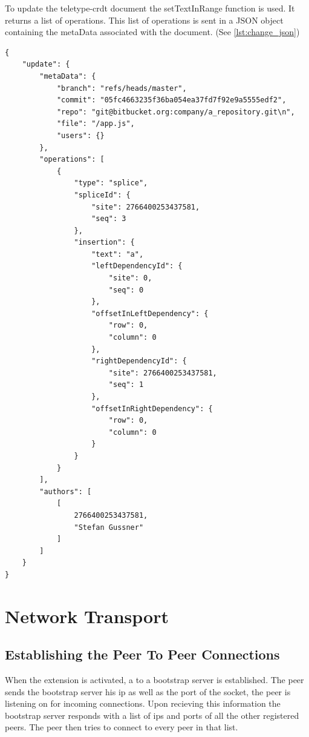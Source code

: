 To update the teletype-crdt document the setTextInRange function is used. It returns a list of operations. This list of operations is sent in a JSON object containing the metaData associated with the document. (See \ref{lst:change_json})

\begin{lstlisting}[label={lst:change_json}, caption=Network Data Packet]
{
    "update": {
        "metaData": {
            "branch": "refs/heads/master",
            "commit": "05fc4663235f36ba054ea37fd7f92e9a5555edf2",
            "repo": "git@bitbucket.org:company/a_repository.git\n",
            "file": "/app.js",
            "users": {}
        },
        "operations": [
            {
                "type": "splice",
                "spliceId": {
                    "site": 2766400253437581,
                    "seq": 3
                },
                "insertion": {
                    "text": "a",
                    "leftDependencyId": {
                        "site": 0,
                        "seq": 0
                    },
                    "offsetInLeftDependency": {
                        "row": 0,
                        "column": 0
                    },
                    "rightDependencyId": {
                        "site": 2766400253437581,
                        "seq": 1
                    },
                    "offsetInRightDependency": {
                        "row": 0,
                        "column": 0
                    }
                }
            }
        ],
        "authors": [
            [
                2766400253437581,
                "Stefan Gussner"
            ]
        ]
    }
}
\end{lstlisting}

\section{Network Transport}

\subsection{Establishing the Peer To Peer Connections}
When the extension is activated, a to a bootstrap server is established. 
The peer sends the bootstrap server his ip as well as the port of the socket, the peer is listening on for incoming connections.
Upon recieving this information the bootstrap server responds with a list of ips and ports of all the other registered peers.
The peer then tries to connect to every peer in that list.

